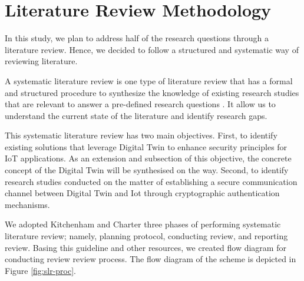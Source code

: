 \chapter{Literature Review Methodology} %

\label{Chapter2} %

In this study, we plan to address half of the research questions through a literature review. Hence, we decided to follow a structured and systematic way of reviewing literature. 

A systematic literature review is one type of literature review that has a formal and structured procedure to synthesize the knowledge of existing research studies that are relevant to answer a pre-defined research questions \cite{kofod-petersen_how_nodate, kitchenham_guidelines_2007}. It allow us to understand the current state of the literature and identify research gaps\cite{carrera-rivera_how-conduct_2022}. 

This systematic literature review has two main objectives. First, to identify existing solutions that leverage Digital Twin to enhance security principles for IoT applications. As an extension and subsection of this objective, the concrete concept of the Digital Twin will be synthesised on the way. Second, to identify research studies conducted on the matter of establishing a secure communication channel between Digital Twin and Iot through cryptographic authentication mechanisms.  

We adopted Kitchenham and Charter three phases of performing systematic literature review; namely, planning protocol, conducting review, and reporting review. Basing this guideline and other resources, we created flow diagram for conducting review review process. The flow diagram of the scheme is depicted in Figure \ref{fig:slr-proc}. 

